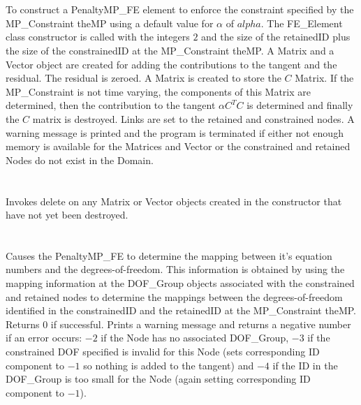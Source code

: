   \\
\\
To construct a PenaltyMP\_FE element to enforce the constraint
specified by the MP\_Constraint \p theMP using a default value for
$\alpha$ of $alpha$. The FE\_Element class constructor is called with
the integers $2$ and the size of the \p retainedID plus the size of
the \p constrainedID at the MP\_Constraint \p theMP. A Matrix
and a Vector object are created for adding the contributions to the
tangent and the residual. The residual is zeroed. A Matrix is created
to store the $C$ Matrix. If the MP\_Constraint is not time varying,
the components of this Matrix are determined, then the contribution
to the tangent $\alpha C^TC$ is determined and finally the $C$ matrix
is destroyed. Links are set to the retained and constrained nodes.
A warning message is printed and the program is terminated if
either not enough memory is available for the Matrices and Vector or the
constrained and retained Nodes do not exist in the Domain.  \\


  \\
  \\
Invokes delete on any Matrix or Vector objects created in the
constructor that have not yet been destroyed. \\

  \\
 \\
Causes the PenaltyMP\_FE to determine the mapping between it's equation
numbers and the degrees-of-freedom. This information is obtained by
using the mapping information at the DOF\_Group objects associated with
the constrained and retained nodes to determine the mappings between
the degrees-of-freedom identified in the \p constrainedID and the
\p retainedID at the MP\_Constraint \p theMP. Returns $0$ if
successful. Prints a warning message and returns a negative number if
an error occurs: $-2$ if the
Node has no associated DOF\_Group, $-3$ if the constrained DOF
specified is invalid for this Node (sets corresponding ID component to
$-1$ so nothing is added to the tangent) and $-4$ if the ID in the
DOF\_Group is too small for the Node (again setting corresponding ID
component to $-1$). \\ 


